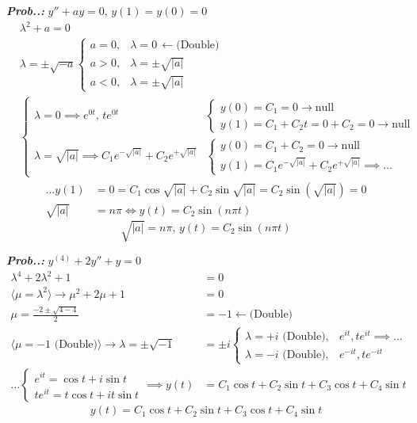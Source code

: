 \documentclass[a4paper]{article}
\begin{document}
\setcounter{equation}{0}
\vspace{2ex}\textbf{\textit{Prob.\thesection.\theprob: }}$y''+ay=0,\,y(1)=y(0)=0$
\begin{align}
&\lambda^{2}+a=0 \\
&\lambda=\pm \sqrt{ -a }\begin{cases}
a=0,&\lambda=0\,\leftarrow\text{(Double)} \\
a>0,&\lambda=\pm\sqrt{ |a| } \\
a<0,&\lambda=\pm\sqrt{ |a| }
\end{cases} \\
&\begin{cases}
\lambda=0\implies e^{ 0t },\,te^{ 0t } & \begin{cases}
y(0)=C_{1}=0 \to \boxed{\text{null}}\\
y(1)=C_{1}+C_{2}t=0+C_{2}=0 \to \boxed{\text{null}}
\end{cases} \\
\lambda=\sqrt{ |a| }\implies C_{1}e^{ -\sqrt{ |a| } }+C_{2}e^{ +\sqrt{ |a| } } & \begin{cases}
y(0)=C_{1}+C_{2}=0 \to \boxed{\text{null}}\\
y(1)=C_{1}e^{ -\sqrt{ |a| } }+C_{2}e^{ +\sqrt{ |a| } } \implies\dots
\end{cases}
\end{cases}
\end{align}
\begin{align}
\dots y(1)&=0=C_{1}\cos \sqrt{ |a| }+C_{2}\sin \sqrt{ |a| }=C_{2}\sin\left(\sqrt{ |a| }\right)=0 \\
\sqrt{ |a| }&=n\pi \iff y(t)=C_{2}\sin\left( n\pi t\right)
\end{align}
$$
\boxed{\sqrt{ |a| }=n\pi,\,y(t)=C_{2}\sin(n\pi t)}
$$

\vspace{2ex}\textbf{\textit{Prob.\thesection.\theprob: }}$y^{(4)}+2y''+y=0$
\begin{align}
\lambda^{4}+2\lambda^{2}+1&=0 \\
\langle \mu=\lambda^{2} \rangle \to \mu^{2}+2\mu+1&=0 \\
\mu=\frac{-2\pm \sqrt{ 4-4 }}{2}&=-1\leftarrow\text{(Double)} \\
\langle \mu=-1\text{ (Double)} \rangle \to \lambda=\pm \sqrt{ -1 }&=\pm i\begin{cases}
\lambda=+i\text{ (Double)},&e^{ it },te^{ it } \implies\dots\\
\lambda=-i\text{ (Double)},&e^{ -it },te^{ -it }
\end{cases} \\
\dots \begin{cases}
e^{ it }=\cos t+i\sin t \\
te^{ it }=t\cos t+it\sin t
\end{cases}\implies y(t)&=C_{1}\cos t+C_{2}\sin t+C_{3}\cos t+C_{4}\sin t
\end{align}
$$
\boxed{y(t)=C_{1}\cos t+C_{2}\sin t+C_{3}\cos t+C_{4}\sin t}
$$
\end{document}
